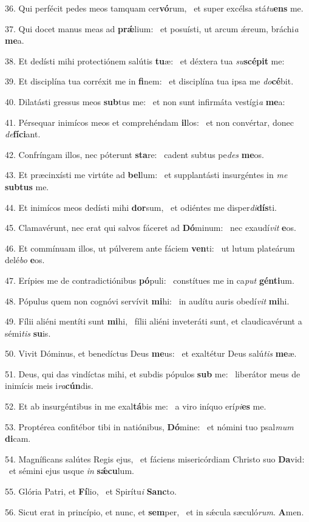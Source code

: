 36. Qui perfécit pedes meos tamquam cer\textbf{vó}rum, \ast\  et super excélsa stá\textit{tu}\textbf{ens} me.\

37. Qui docet manus meas ad \textbf{prǽ}lium: \ast\  et posuísti, ut arcum ǽreum, bráchi\textit{a} \textbf{me}a.\

38. Et dedísti mihi protectiónem salútis \textbf{tu}æ: \ast\  et déxtera tua \textit{su}\textbf{scé}\textbf{pit} me:\

39. Et disciplína tua corréxit me in \textbf{fi}nem: \ast\  et disciplína tua ipsa me \textit{do}\textbf{cé}bit.\

40. Dilatásti gressus meos \textbf{sub}tus me: \ast\  et non sunt infirmáta vestígi\textit{a} \textbf{me}a:\

41. Pérsequar inimícos meos et comprehéndam \textbf{il}los: \ast\  et non convértar, donec \textit{de}\textbf{fí}\textbf{ci}ant.\

42. Confríngam illos, nec póterunt \textbf{sta}re: \ast\  cadent subtus pe\textit{des} \textbf{me}os.\

43. Et præcinxísti me virtúte ad \textbf{bel}lum: \ast\  et supplantásti insurgéntes in \textit{me} \textbf{sub}\textbf{tus} me.\

44. Et inimícos meos dedísti mihi \textbf{dor}sum, \ast\  et odiéntes me disper\textit{di}\textbf{dís}ti.\

45. Clamavérunt, nec erat qui salvos fáceret ad \textbf{Dó}minum: \ast\  nec exaudí\textit{vit} \textbf{e}os.\

46. Et commínuam illos, ut púlverem ante fáciem \textbf{ven}ti: \ast\  ut lutum plateárum delé\textit{bo} \textbf{e}os.\

47. Erípies me de contradictiónibus \textbf{pó}puli: \ast\  constítues me in ca\textit{put} \textbf{gén}\textbf{ti}um.\

48. Pópulus quem non cognóvi servívit \textbf{mi}hi: \ast\  in audítu auris obedí\textit{vit} \textbf{mi}hi.\

49. Fílii aliéni mentíti sunt \textbf{mi}hi, \ast\  fílii aliéni inveteráti sunt, et claudicavérunt a sémi\textit{tis} \textbf{su}is.\

50. Vivit Dóminus, et benedíctus Deus \textbf{me}us: \ast\  et exaltétur Deus salú\textit{tis} \textbf{me}æ.\

51. Deus, qui das vindíctas mihi, et subdis pópulos \textbf{sub} me: \ast\  liberátor meus de inimícis meis i\textit{ra}\textbf{cún}dis.\

52. Et ab insurgéntibus in me exal\textbf{tá}bis me: \ast\  a viro iníquo erí\textit{pi}\textbf{es} me.\

53. Proptérea confitébor tibi in natiónibus, \textbf{Dó}mine: \ast\  et nómini tuo psal\textit{mum} \textbf{di}cam.\

54. Magníficans salútes Regis ejus, \dag\  et fáciens misericórdiam Christo suo \textbf{Da}vid: \ast\  et sémini ejus usque \textit{in} \textbf{sǽ}\textbf{cu}lum.\

55. Glória Patri, et \textbf{Fí}lio, \ast\  et Spirítu\textit{i} \textbf{Sanc}to.\

56. Sicut erat in princípio, et nunc, et \textbf{sem}per, \ast\  et in sǽcula sæculó\textit{rum}. \textbf{A}men.\

